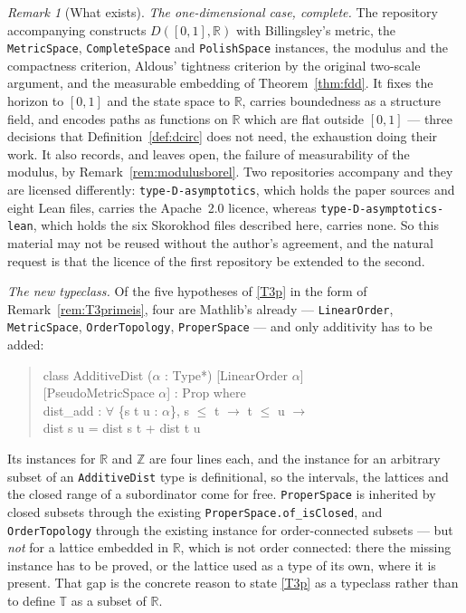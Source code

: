 \documentclass[11pt,a4paper]{article}
\theoremstyle{plain}
\theoremstyle{definition}
\theoremstyle{remark}
\newtheorem{remark}[theorem]{Remark}
\newcommand{\R}{\mathbb{R}}
\newcommand{\T}{\mathbb{T}}                     %
\begin{document}
\begin{remark}[What exists]
  \emph{The one-dimensional case, complete.}  The repository accompanying
  \cite{Kuan26} constructs $D([0,1],\R)$ with Billingsley's metric, the
  \texttt{MetricSpace}, \texttt{CompleteSpace} and \texttt{PolishSpace}
  instances, the modulus and the compactness criterion, Aldous' tightness
  criterion by the original two-scale argument, and the measurable embedding of
  Theorem~\ref{thm:fdd}.  It fixes the horizon to $[0,1]$ and the state space to
  $\R$, carries boundedness as a structure field, and encodes paths as functions
  on $\R$ which are flat outside $[0,1]$ --- three decisions that
  Definition~\ref{def:dcirc} does not need, the exhaustion doing their work.  It
  also records, and leaves open, the failure of measurability of the modulus, by
  Remark~\ref{rem:modulusborel}.  Two repositories accompany \cite{Kuan26} and
  they are licensed differently: \texttt{type-D-asymptotics}, which holds the
  paper sources and eight Lean files, carries the Apache~2.0 licence, whereas
  \texttt{type-D-asymptotics-lean}, which holds the six Skorokhod files
  described here, carries none.  So this material may not be reused without the
  author's agreement, and the natural request is that the licence of the first
  repository be extended to the second.

  \emph{The new typeclass.}  Of the five hypotheses of \eqref{T3p} in the form of
  Remark~\ref{rem:T3primeis}, four are Mathlib's already ---
  \texttt{LinearOrder}, \texttt{MetricSpace}, \texttt{OrderTopology},
  \texttt{ProperSpace} --- and only additivity has to be added:
  \begin{quote}\ttfamily\footnotesize
    class AdditiveDist ($\alpha$ : Type*) [LinearOrder $\alpha$]\\
    \phantom{ss}[PseudoMetricSpace $\alpha$] : Prop where\\
    \phantom{ss}dist\_add : $\forall$ \{s t u : $\alpha$\}, s $\le$ t $\to$ t $\le$ u $\to$\\
    \phantom{ssssss}dist s u = dist s t + dist t u
  \end{quote}
  Its instances for $\R$ and $\mathbb{Z}$ are four lines each, and the instance for an
  arbitrary subset of an \texttt{AdditiveDist} type is definitional, so the
  intervals, the lattices and the closed range of a subordinator come for free.
  \texttt{ProperSpace} is inherited by closed subsets through the existing
  \texttt{ProperSpace.of\_isClosed}, and \texttt{OrderTopology} through the
  existing instance for order-connected subsets --- but \emph{not} for a lattice
  embedded in $\R$, which is not order connected: there the missing instance has
  to be proved, or the lattice used as a type of its own, where it is present.
  That gap is the concrete reason to state \eqref{T3p} as a typeclass rather than
  to define $\T$ as a subset of $\R$.
\end{remark}
\end{document}
